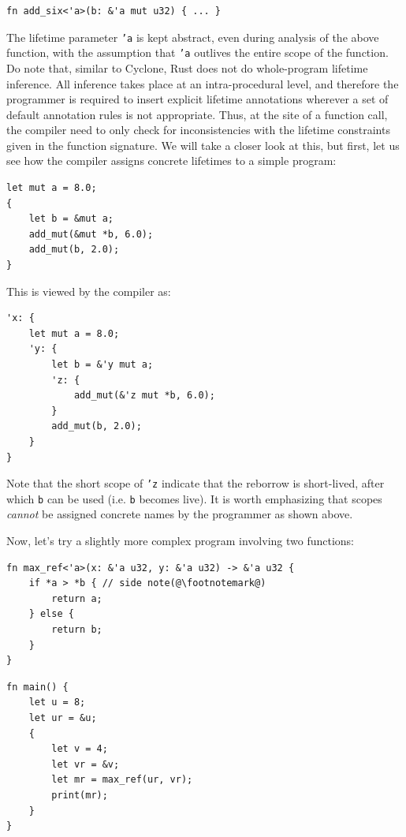 \documentclass[11pt]{report}
\begin{document}
\begin{lstlisting}
fn add_six<'a>(b: &'a mut u32) { ... }
\end{lstlisting}

The lifetime parameter \texttt{'a} is kept abstract, even during analysis of the above function, with the assumption that \texttt{'a} outlives the entire scope of the function. Do note that, similar to Cyclone, Rust does not do whole-program lifetime inference. All inference takes place at an intra-procedural level, and therefore the programmer is required to insert explicit lifetime annotations wherever a set of default annotation rules is not appropriate. Thus, at the site of a function call, the compiler need to only check for inconsistencies with the lifetime constraints given in the function signature. We will take a closer look at this, but first, let us see how the compiler assigns concrete lifetimes to a simple program:

\begin{lstlisting}
let mut a = 8.0;
{
    let b = &mut a;
    add_mut(&mut *b, 6.0);
    add_mut(b, 2.0);
}
\end{lstlisting}

\noindent This is viewed by the compiler as:

\begin{lstlisting}
'x: {
    let mut a = 8.0;
    'y: {
        let b = &'y mut a;
        'z: {
            add_mut(&'z mut *b, 6.0);
        }
        add_mut(b, 2.0);
    }
}
\end{lstlisting}

Note that the short scope of \texttt{'z} indicate that the reborrow is short-lived, after which \texttt{b} can be used (i.e. \texttt{b} becomes live). It is worth emphasizing that scopes \textit{cannot} be assigned concrete names by the programmer as shown above.

Now, let's try a slightly more complex program involving two functions:

\begin{lstlisting}
fn max_ref<'a>(x: &'a u32, y: &'a u32) -> &'a u32 {
    if *a > *b { // side note(@\footnotemark@)
        return a;
    } else {
        return b;
    }
}
\end{lstlisting}

\newpage

\begin{lstlisting}
fn main() {
    let u = 8;
    let ur = &u;
    {
        let v = 4;
        let vr = &v;
        let mr = max_ref(ur, vr);
        print(mr);
    }
}
\end{lstlisting}
\end{document}
